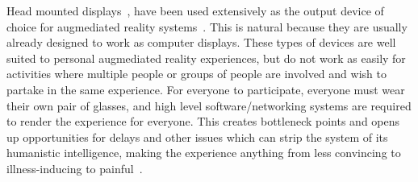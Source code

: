 \documentclass{sigchi-ext}
\begin{document}
Head mounted displays~\cite{mann1997wearable}, have been used extensively as
the output device of choice for augmediated reality
systems~\cite{caudell1992augmented}.
This is natural because they are usually already
designed to work as computer displays. These types of devices are well suited
to personal augmediated reality experiences, but do not work as easily for
activities where multiple people or groups of people are involved and wish to
partake in the same experience. For everyone to participate, everyone must wear
their own pair of glasses, and high level software/networking systems are
required to render the experience for everyone. This creates bottleneck points
and opens up opportunities for delays and other issues which can strip the
system of its humanistic intelligence, making the experience anything from less
convincing to illness-inducing to painful~\cite{drascic1996perceptual}.
\end{document}

